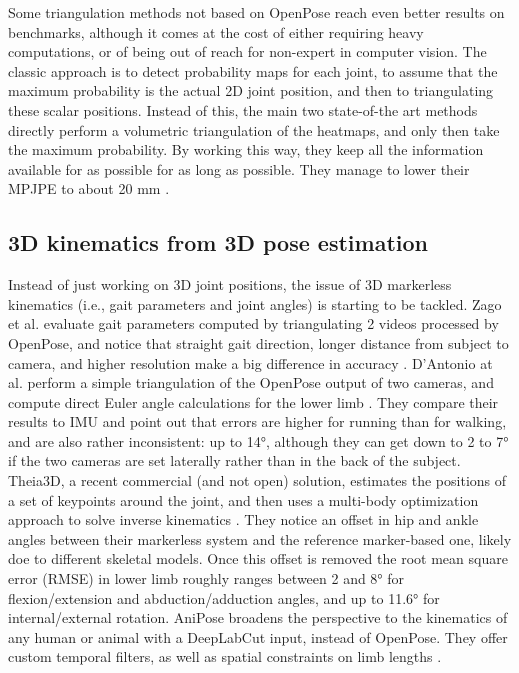 Some triangulation methods not based on OpenPose reach even better results on benchmarks, although it comes at the cost of either requiring heavy computations, or of being out of reach for non-expert in computer vision. The classic approach is to detect probability maps for each joint, to assume that the maximum probability is the actual 2D joint position, and then to triangulating these scalar positions. Instead of this, the main two state-of-the art methods directly perform a volumetric triangulation of the heatmaps, and only then take the maximum probability. By working this way, they keep all the information available for as possible for as long as possible. They manage to lower their MPJPE to about 20 mm \cite{He2020,Iskakov2019}.


\subsection{3D kinematics from 3D pose estimation}

Instead of just working on 3D joint positions, the issue of 3D markerless kinematics (i.e., gait parameters and joint angles) is starting to be tackled. Zago et al. evaluate gait parameters computed by triangulating 2 videos processed by OpenPose, and notice that straight gait direction, longer distance from subject to camera, and higher resolution make a big difference in accuracy \cite{Zago2020}. D’Antonio at al. perform a simple triangulation of the OpenPose output of two cameras, and compute direct Euler angle calculations for the lower limb \cite{D'Antonio2021}. They compare their results to IMU and point out that errors are higher for running than for walking, and are also rather inconsistent: up to 14°, although they can get down to 2 to 7° if the two cameras are set laterally rather than in the back of the subject. Theia3D, a recent commercial (and not open) solution, estimates the positions of a set of keypoints around the joint, and then uses a multi-body optimization approach to solve inverse kinematics \cite{Kanko2021a,Kanko2021b}. They notice an offset in hip and ankle angles between their markerless system and the reference marker-based one, likely doe to different skeletal models. Once this offset is removed the root mean square error (RMSE) in lower limb roughly ranges between 2 and 8° for flexion/extension and abduction/adduction angles, and up to 11.6° for internal/external rotation. AniPose broadens the perspective to the kinematics of any human or animal with a DeepLabCut input, instead of OpenPose. They offer custom temporal filters, as well as spatial constraints on limb lengths \cite{Karashchuk2021}.


